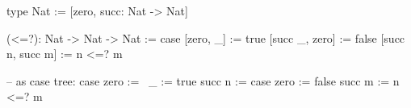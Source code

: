 \begin{alba}
    type Nat := [zero, succ: Nat -> Nat]

    (<=?): Nat -> Nat -> Nat := case
        [zero, _]        :=  true
        [succ _, zero]   :=  false
        [succ n, succ m] :=  n <=? m

    -- as case tree:
    case
        zero           :=   \ _ := true
        succ n :=
            case
                zero   :=   false
                succ m :=   n <=? m
\end{alba}
